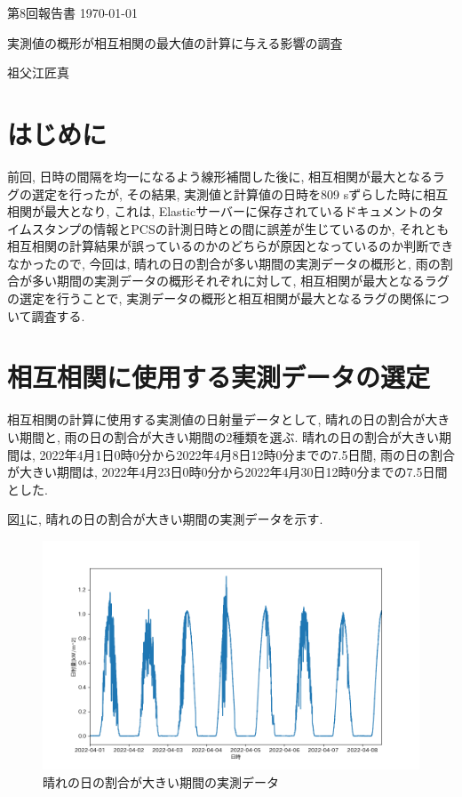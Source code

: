 \documentclass[a4j,12pt,]{jarticle}
\begin{document}
{\noindent\small 第8回報告書 \hfill\today}
\begin{center}
  {\Large 実測値の概形が相互相関の最大値の計算に与える影響の調査}
\end{center}
\begin{flushright}
  祖父江匠真 \\
\end{flushright}

\section{はじめに}
前回, 日時の間隔を均一になるよう線形補間した後に, 相互相関が最大となるラグの選定を行ったが, その結果, 実測値と計算値の日時を809 \si{\second}ずらした時に相互相関が最大となり, これは, Elasticサーバーに保存されているドキュメントのタイムスタンプの情報とPCSの計測日時との間に誤差が生じているのか, それとも相互相関の計算結果が誤っているのかのどちらが原因となっているのか判断できなかったので, 今回は, 晴れの日の割合が多い期間の実測データの概形と, 雨の割合が多い期間の実測データの概形それぞれに対して, 相互相関が最大となるラグの選定を行うことで, 実測データの概形と相互相関が最大となるラグの関係について調査する.

\section{相互相関に使用する実測データの選定}
相互相関の計算に使用する実測値の日射量データとして, 晴れの日の割合が大きい期間と, 雨の日の割合が大きい期間の2種類を選ぶ.
晴れの日の割合が大きい期間は, 2022年4月1日0時0分から2022年4月8日12時0分までの7.5日間, 雨の日の割合が大きい期間は, 2022年4月23日0時0分から2022年4月30日12時0分までの7.5日間とした.

図\ref{p1}に, 晴れの日の割合が大きい期間の実測データを示す.

\begin{figure}[H]
  \begin{center}
    \includegraphics[width=160mm]{1.png}
    \caption{晴れの日の割合が大きい期間の実測データ}
    \label{p1}
  \end{center}
\end{figure}
\end{document}
